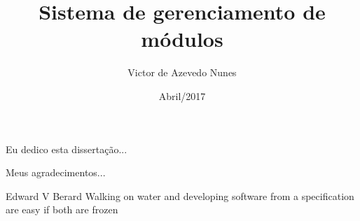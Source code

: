 \documentclass[pt,twoside,onehalfspacing,bsc]{risethesis}
\title{Sistema de gerenciamento de módulos}
\date{Abril/2017}
\author{Victor de Azevedo Nunes}
\begin{document}
\frontmatter
\frontpage
\presentationpage

\begin{dedicatory}
Eu dedico esta dissertação...
\end{dedicatory}

\acknowledgements
Meus agradecimentos...

\begin{epigraph}[]{Edward V Berard}
Walking on water and developing software from a specification are easy if both are frozen
\end{epigraph}

\resumo


\abstract


\tableofcontents

\listoffigures

\listoftables

\listofacronyms



\mainmatter







%


\clearpage
\addappheadtotoc
\appendix
\appendixpage
% 
\end{document}
